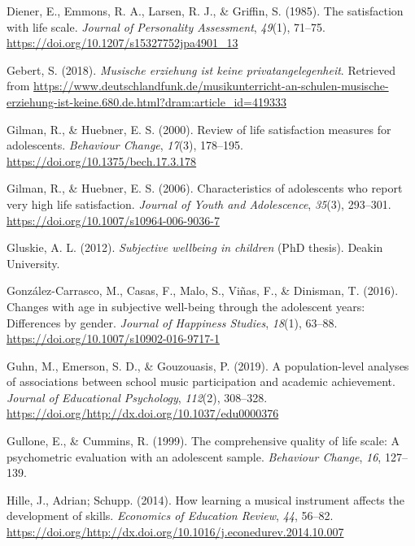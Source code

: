 \documentclass[a4, 12pt]{article}
\begin{document}
\leavevmode\hypertarget{ref-Diener1985}{}%
Diener, E., Emmons, R. A., Larsen, R. J., \& Griffin, S. (1985). The satisfaction with life scale. \emph{Journal of Personality Assessment}, \emph{49}(1), 71--75. \url{https://doi.org/10.1207/s15327752jpa4901_13}

\leavevmode\hypertarget{ref-Gebert2018}{}%
Gebert, S. (2018). \emph{Musische erziehung ist keine privatangelegenheit}. Retrieved from \url{https://www.deutschlandfunk.de/musikunterricht-an-schulen-musische-erziehung-ist-keine.680.de.html?dram:article_id=419333}

\leavevmode\hypertarget{ref-Gilman2000}{}%
Gilman, R., \& Huebner, E. S. (2000). Review of life satisfaction measures for adolescents. \emph{Behaviour Change}, \emph{17}(3), 178--195. \url{https://doi.org/10.1375/bech.17.3.178}

\leavevmode\hypertarget{ref-Gilman2006}{}%
Gilman, R., \& Huebner, E. S. (2006). Characteristics of adolescents who report very high life satisfaction. \emph{Journal of Youth and Adolescence}, \emph{35}(3), 293--301. \url{https://doi.org/10.1007/s10964-006-9036-7}

\leavevmode\hypertarget{ref-Gluskie2012}{}%
Gluskie, A. L. (2012). \emph{Subjective wellbeing in children} (PhD thesis). Deakin University.

\leavevmode\hypertarget{ref-GonzalezCarrasco2016}{}%
González-Carrasco, M., Casas, F., Malo, S., Viñas, F., \& Dinisman, T. (2016). Changes with age in subjective well-being through the adolescent years: Differences by gender. \emph{Journal of Happiness Studies}, \emph{18}(1), 63--88. \url{https://doi.org/10.1007/s10902-016-9717-1}

\leavevmode\hypertarget{ref-Guhn2019}{}%
Guhn, M., Emerson, S. D., \& Gouzouasis, P. (2019). A population-level analyses of associations between school music participation and academic achievement. \emph{Journal of Educational Psychology}, \emph{112}(2), 308--328. \url{https://doi.org/http://dx.doi.org/10.1037/edu0000376}

\leavevmode\hypertarget{ref-Gullone1999}{}%
Gullone, E., \& Cummins, R. (1999). The comprehensive quality of life scale: A psychometric evaluation with an adolescent sample. \emph{Behaviour Change}, \emph{16}, 127--139.

\leavevmode\hypertarget{ref-Hille2014}{}%
Hille, J., Adrian; Schupp. (2014). How learning a musical instrument affects the development of skills. \emph{Economics of Education Review}, \emph{44}, 56--82. \url{https://doi.org/http://dx.doi.org/10.1016/j.econedurev.2014.10.007}
\end{document}
